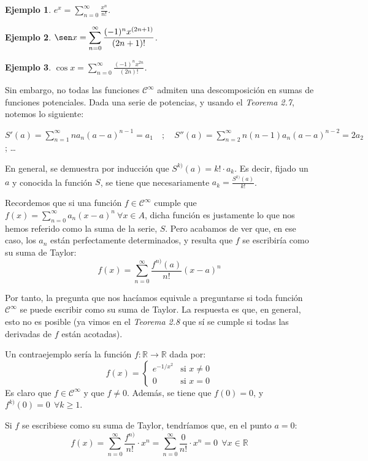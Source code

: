 \documentclass[11pt, a4paper]{article}
\theoremstyle{theorem-style}
\theoremstyle{definition-style}
\theoremstyle{remark-style}
\theoremstyle{example-style}
\newtheorem{ejemplo}{Ejemplo}[section]
\begin{document}
\begin{ejemplo}
	$e^x = \displaystyle \sum_{n=0}^\infty  \frac{x^n}{n!}$. 
\end{ejemplo}

\begin{ejemplo}
	$\sen x = \displaystyle \sum_{n=0}^\infty   \frac{(-1)^n x^{(2n+1)}}{(2n+1)!}$.
\end{ejemplo}
\begin{ejemplo}
	$\cos x = \displaystyle \sum_{n=0}^\infty   \frac{(-1)^n x^{2n}}{(2n)!}$.
\end{ejemplo}


Sin embargo, no todas las funciones $\mathcal{C}^{\infty}$ admiten una descomposición en sumas de funciones potenciales. Dada una serie de potencias, y usando el \textit{Teorema 2.7}, notemos lo siguiente:

$\displaystyle S'(a) = \sum_{n=1}^{\infty} na_n(a-a)^{n-1} = a_1 \quad ; \quad S''(a) = \sum_{n=2}^{\infty} n(n-1)a_n(a-a)^{n-2} = 2a_2$ \quad ; \quad \dots

En general, se demuestra por inducción que $S^{k)} (a) = k! \cdot a_k$. Es decir, fijado un $a$ y conocida la función $S$, se tiene que necesariamente $a_k = \frac{S^{k)}(a)}{k!}$.

Recordemos que si una función $f \in \mathcal{C}^{\infty}$ cumple que $f(x) = \sum_{n=0}^{\infty} a_n(x-a)^n\ \forall x \in A$, dicha función es justamente lo que nos hemos referido como la suma de la serie, $S$. Pero acabamos de ver que, en ese caso, los $a_n$ están perfectamente determinados, y resulta que $f$ se escribiría como su suma de Taylor: $$f(x) = \sum_{n=0}^{\infty} \frac{f^{n)}(a)}{n!} (x-a)^n$$

Por tanto, la pregunta que nos hacíamos equivale a preguntarse si toda función $\mathcal{C}^{\infty}$ se puede escribir como su suma de Taylor. La respuesta es que, en general, esto no es posible (ya vimos en el \textit{Teorema 2.8} que sí se cumple si todas las derivadas de $f$ están acotadas).

Un contraejemplo sería la función $f: \mathbb{R} \longrightarrow \mathbb{R}$ dada por: $$f(x) = \begin{cases}
	         e^{-1/x^2} & \text{si } x\ne 0\\
	         0 & \text{si } x=0
\end{cases}$$ Es claro que $f \in \mathcal{C}^{\infty}$ y que $f \ne 0$. Además, se tiene que $f(0) = 0$, y $f^{k)}(0) = 0\ \ \forall k \ge 1$. 

Si $f$ se escribiese como su suma de Taylor, tendríamos que, en el punto $a=0$: $$f(x) = \sum_{n=0}^{\infty} \frac{f^{n)}}{n!} \cdot x^n =  \sum_{n=0}^{\infty} \frac{0}{n!}\cdot x^n = 0\ \ \forall x \in \mathbb{R}$$
\end{document}
